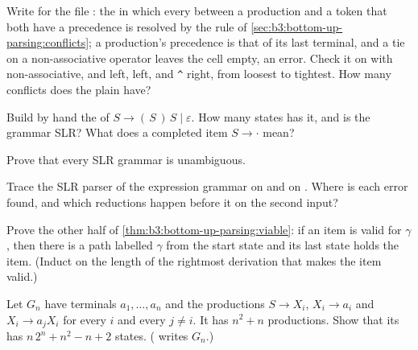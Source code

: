 \begin{exercise}[$\star\star$]\label{exo:b3:bottom-up-parsing:6}
Write  for the file : the  in which every  between a production and a token that both have a precedence is resolved by the rule of \cref{sec:b3:bottom-up-parsing:conflicts}; a production's precedence is that of its last terminal, and a tie on a non-associative operator leaves the cell empty, an error. Check it on  with \code{==} non-associative, \code{+} and \code{-} left, \code{*} left, and \texttt{\textasciicircum} right, from loosest to tightest. How many conflicts does the plain  have?
\end{exercise}

\begin{exercise}[$\star\star$]\label{exo:b3:bottom-up-parsing:7}
Build by hand the  of $S \to (\,S\,)\,S \mid \varepsilon$. How many states has it, and is the grammar SLR? What does a completed item $S \to \cdot$ mean?
\end{exercise}

\begin{exercise}[$\star\star$]\label{exo:b3:bottom-up-parsing:8}
Prove that every SLR grammar is unambiguous.
\end{exercise}

\begin{exercise}[$\star\star$]\label{exo:b3:bottom-up-parsing:9}
Trace the SLR parser of the expression grammar on  and on . Where is each error found, and which reductions happen before it on the second input?
\end{exercise}

\begin{exercise}[$\star\star\star$]\label{exo:b3:bottom-up-parsing:10}
Prove the other half of \cref{thm:b3:bottom-up-parsing:viable}: if an item is valid for $\gamma$, then there is a path labelled $\gamma$ from the start state and its last state holds the item. (Induct on the length of the rightmost derivation that makes the item valid.)
\end{exercise}

\begin{exercise}[$\star\star\star$]\label{exo:b3:bottom-up-parsing:11}
Let $G_n$ have terminals $a_1, \dots, a_n$ and the productions $S \to X_i$, $X_i \to a_i$ and $X_i \to a_j X_i$ for every $i$ and every $j \ne i$. It has $n^2 + n$ productions. Show that its  has $n\,2^n + n^2 - n + 2$ states. ( writes $G_n$.)
\end{exercise}

